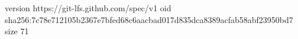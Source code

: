 version https://git-lfs.github.com/spec/v1
oid sha256:7c78e712105b2367e7bfed68c6aacbad017d835dca8389acfab58abf23950bd7
size 71

